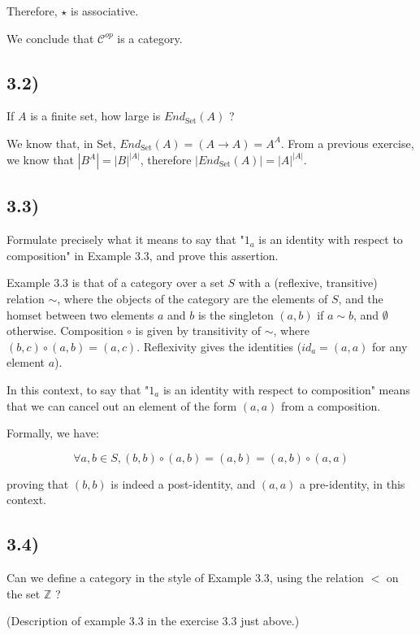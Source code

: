 \documentclass[12pt, letterpaper, twoside]{report}
\begin{document}
Therefore, $\star$ is associative.

We conclude that $\mathcal{C}^{op}$ is a category.



\subsection*{3.2)}

If $A$ is a finite set, how large is $End_{\text{Set}}(A)$ ?

We know that, in Set, $End_{\text{Set}}(A) = (A \to A) = A^A$. From a previous exercise, we know that $|B^A| = |B|^{|A|}$, therefore $|End_{\text{Set}}(A)| = |A|^{|A|}$.



\subsection*{3.3)}

Formulate precisely what it means to say that "$1_a$ is an identity with respect to composition" in Example 3.3, and prove this assertion.

Example 3.3 is that of a category over a set $S$ with a (reflexive, transitive) relation $\sim$, where the objects of the category are the elements of $S$, and the homset between two elements $a$ and $b$ is the singleton $(a,b)$ if $a \sim b$, and $\emptyset$ otherwise. Composition $\circ$ is given by transitivity of $\sim$, where $(b,c) \circ (a,b) = (a,c)$. Reflexivity gives the identities ($id_a = (a,a)$ for any element $a$).

In this context, to say that "$1_a$ is an identity with respect to composition" means that we can cancel out an element of the form $(a,a)$ from a composition.

Formally, we have:

$$\forall a,b \in S, (b,b) \circ (a,b) = (a,b) = (a,b) \circ (a,a)$$

proving that $(b,b)$ is indeed a post-identity, and $(a,a)$ a pre-identity, in this context.



\subsection*{3.4)}

Can we define a category in the style of Example 3.3, using the relation $<$ on the set $\mathbb{Z}$ ?

(Description of example 3.3 in the exercise 3.3 just above.)
\end{document}
